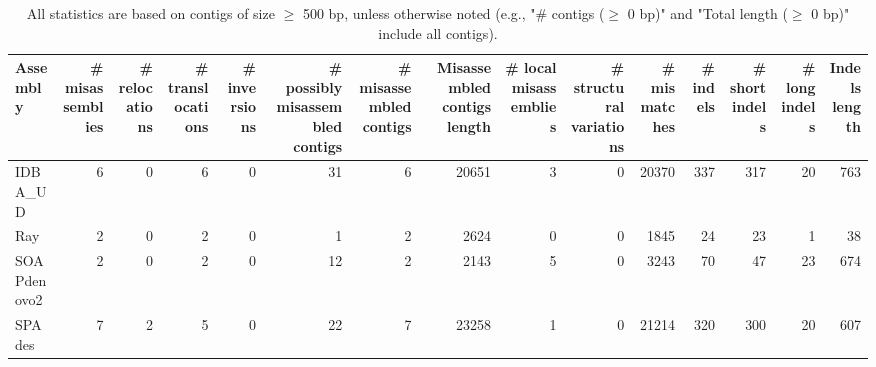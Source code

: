 \documentclass[12pt,a4paper]{article}
\begin{document}
\begin{table}[ht]
\begin{center}
\caption{All statistics are based on contigs of size $\geq$ 500 bp, unless otherwise noted (e.g., "\# contigs ($\geq$ 0 bp)" and "Total length ($\geq$ 0 bp)" include all contigs).}
\begin{tabular}{|l*{14}{|r}|}
\hline
Assembly & \# misassemblies &     \# relocations &     \# translocations &     \# inversions & \# possibly misassembled contigs & \# misassembled contigs & Misassembled contigs length & \# local misassemblies & \# structural variations & \# mismatches & \# indels &     \# short indels &     \# long indels & Indels length \\ \hline
IDBA\_UD & 6 & 0 & 6 & 0 & 31 & 6 & 20651 & 3 & 0 & 20370 & 337 & 317 & 20 & 763 \\ \hline
Ray & 2 & 0 & 2 & 0 & 1 & 2 & 2624 & 0 & 0 & 1845 & 24 & 23 & 1 & 38 \\ \hline
SOAPdenovo2 & 2 & 0 & 2 & 0 & 12 & 2 & 2143 & 5 & 0 & 3243 & 70 & 47 & 23 & 674 \\ \hline
SPAdes & 7 & 2 & 5 & 0 & 22 & 7 & 23258 & 1 & 0 & 21214 & 320 & 300 & 20 & 607 \\ \hline
\end{tabular}
\end{center}
\end{table}
\end{document}
